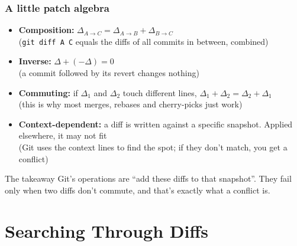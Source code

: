 \documentclass[aspectratio=169,10pt,compress]{beamer}
\newcommand{\cmd}[1]{\texttt{\color{gitred}#1}}
\begin{document}
\begin{frame}[t,fragile] \frametitle{A little patch algebra}
  \begin{itemize}
    \item \textbf{Composition:} $\Delta_{A \to C} = \Delta_{A \to B} + \Delta_{B \to C}$\\
          \small (\cmd{git diff A C} equals the diffs of all commits in between, combined)
    \item \textbf{Inverse:} $\Delta + (-\Delta) = 0$\\
          \small (a commit followed by its revert changes nothing)
    \item \textbf{Commuting:} if $\Delta_1$ and $\Delta_2$ touch different lines,
          $\Delta_1 + \Delta_2 = \Delta_2 + \Delta_1$\\
          \small (this is why most merges, rebases and cherry-picks just work)
    \item \textbf{Context-dependent:} a diff is written against a specific snapshot.
          Applied elsewhere, it may not fit\\
          \small (Git uses the context lines to find the spot; if they don't match, you get a conflict)
  \end{itemize}

  \vspace{0.5em}
  \begin{block}{The takeaway}
    Git's operations are ``add these diffs to that snapshot''. They fail only
    when two diffs don't commute, and that's exactly what a conflict is.
  \end{block}
\end{frame}

\section[Search]{Searching Through Diffs}
\end{document}
